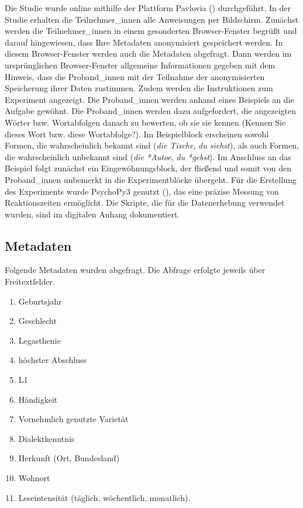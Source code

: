   Die Studie wurde online mithilfe der Plattform Pavlovia (\cite{PsychoPyTeam.2019}) durchgeführt. In der Studie erhalten die Teilnehmer\_innen alle Anweisungen per Bildschirm. Zunächst werden die Teilnehmer\_innen in einem gesonderten Browser-Fenster begrüßt und darauf hingewiesen, dass Ihre Metadaten anonymisiert gespeichert werden. In diesem Brow\-ser-Fenster werden auch die Metadaten abgefragt. Dann werden im ursprünglichen Browser-Fenster allgemeine Informationen gegeben mit dem Hinweis, dass die Proband\_innen mit der Teilnahme der anonymisierten Speicherung ihrer Daten zustimmen. Zudem werden die Instruktionen zum Experiment angezeigt. Die Proband\_innen werden anhand eines Beispiels an die Aufgabe gewöhnt. Die Proband\_innen werden dazu aufgefordert, die angezeigten Wörter bzw. Wortabfolgen danach zu bewerten, ob sie sie kennen (Kennen Sie dieses Wort bzw. diese Wortabfolge?). Im Beispielblock erscheinen sowohl Formen, die wahrscheinlich bekannt sind (\textit{die Tische}, \textit{du siehst}), als auch Formen, die wahrscheinlich unbekannt sind (\textit{die *Autoe}, \textit{du *gebst}). Im Anschluss an das Beispiel folgt zunächst ein Eingewöhnungsblock, der fließend und somit von den Proband\_innen unbemerkt in die Experimentblöcke übergeht. 
  Für die Erstellung des Experiments wurde PsychoPy3 genutzt (\cite{Peirce.2019}), das eine präzise Messung von Reaktionszeiten ermöglicht. Die Skripte, die für die Datenerhebung verwendet wurden, sind im digitalen Anhang dokumentiert.

\subsection{Metadaten}
\label{studiefreqmeta}

Folgende Metadaten wurden abgefragt. Die Abfrage erfolgte jeweils über Freitextfelder.

\begin{enumerate}
\item Geburtsjahr
\item Geschlecht
\item Legasthenie
\item höchster Abschluss
\item L1
\item Händigkeit 
\item Vornehmlich genutzte Varietät 
\item Dialektkenntnis 
\item Herkunft (Ort, Bundesland)
\item Wohnort
\item Leseintensität (täglich, wöchentlich, monatlich).
\end{enumerate}

